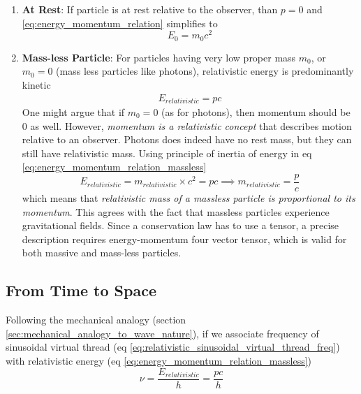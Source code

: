\documentclass[11pt, a4paper]{article}
\begin{document}
\begin{enumerate}
	\item \textbf{At Rest}: If particle is at rest relative to the observer, than $p=0$ and \eqref{eq:energy_momentum_relation} simplifies to 
	\begin{equation*}
		E_{0} = m_{0}c^{2} \tag{mass-energy equivalence}
	\end{equation*}
		                           
	\item \textbf{Mass-less Particle}: For particles having very low proper mass $m_{0}$, or $m_{0} = 0$ (mass less particles like photons), relativistic energy is predominantly kinetic
	\begin{align}\label{eq:energy_momentum_relation_massless}
		E_{relativistic} = pc
	\end{align}
	One might argue that if $m_{0}=0$ (as for photons), then momentum should be $0$ as well. However, \textit{momentum is a relativistic concept} that describes motion relative to an observer. Photons does indeed have no rest mass, but they can still have relativistic mass. Using principle of inertia of energy in eq \eqref{eq:energy_momentum_relation_massless}
	\begin{equation}\label{eq:relativistic_mass_as_p_by_c}
		E_{relativistic} = m_{relativistic} \times c^{2} = pc \implies \boxed{m_{relativistic} = \frac{p}{c}}
	\end{equation}
	which means that \textit{relativistic mass of a massless particle is proportional to its momentum}. This agrees with the fact that massless particles experience gravitational fields. Since a conservation law has to use a tensor, a precise description requires energy-momentum four vector tensor, which is valid for both massive and mass-less particles.
\end{enumerate}

\subsection{From Time to Space}
Following the mechanical analogy (section \ref{sec:mechanical_analogy_to_wave_nature}), if we associate frequency of sinusoidal virtual thread (eq \ref{eq:relativistic_sinusoidal_virtual_thread_freq}) with relativistic energy (eq \eqref{eq:energy_momentum_relation_massless})
\begin{equation*}
	\nu = \frac{E_{relativistic}}{h} = \frac{pc}{h}
\end{equation*}
\end{document}
